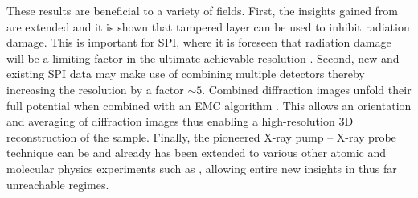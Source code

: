 %
%
These results are beneficial to a variety of fields. First, the insights gained from \citep{Hoener-2008-JPB,Gorkhover-2016-NatPho} are extended and it is shown that tampered layer can be used to inhibit radiation damage. This is important for SPI, where it is foreseen that radiation damage will be a limiting factor in the ultimate achievable resolution \citep{Aquila-2015-StrucDyn}. Second, new and existing SPI data may make use of combining multiple detectors thereby increasing the resolution by a factor $\sim 5$. Combined diffraction images unfold their full potential when combined with an EMC algorithm \citep{Loh-2009-PRE}. This allows an orientation and averaging of diffraction images thus enabling a high-resolution 3D reconstruction of the sample. Finally, the pioneered X-ray pump -- X-ray probe technique can be and already has been extended to various other atomic and molecular physics experiments such as \citep{Picon-2016-NatComm,Lehmann-2016-PRA,Kimberg-2016-FD,Al-Haddad-2017-unpublished,Ferguson-2016-SciAdv}, allowing entire new insights in thus far unreachable regimes.
%
%
%